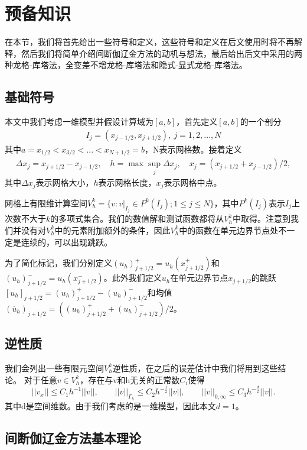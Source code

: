 \cleardoublepage

\section{预备知识}
在本节，我们将首先给出一些符号和定义，这些符号和定义在后文使用时将不再解释，然后我们将简单介绍间断伽辽金方法的动机与想法，最后给出后文中采用的两种龙格-库塔法，全变差不增龙格-库塔法和隐式-显式龙格-库塔法。
\subsection{基础符号}
本文中我们考虑一维模型并假设计算域为$[a,b]$，首先定义$[a,b]$的一个剖分
\begin{align*}
    I_{j} = (x_{j-1/2}, x_{j+1/2}), \ j = 1, 2, ..., N
\end{align*}
其中$a=x_{1/2} < x_{3/2}< ...< x_{N+1/2}=b$，N表示网格数。接着定义
\begin{align*}
    \Delta x_j = x_{j+1/2}-x_{j-1/2}, \quad h = \max{\sup_j{\Delta x_j}}, \quad x_j = (x_{j+1/2}+x_{j-1/2})/{2},
\end{align*}
其中$\Delta x_j$表示网格大小，$h$表示网格长度，$x_j$表示网格中点。

网格上有限维计算空间$V_h^k = \{v:v|_{I_j}\in P^k(I_j); 1\leq j\leq N\}$，其中$P^k(I_j)$表示$I_j$上次数不大于$k$的多项式集合。我们的数值解和测试函数都将从$V_h^k$中取得。注意到我们并没有对$V^k_h$中的元素附加额外的条件，因此$V_h^k$中的函数在单元边界节点处不一定是连续的，可以出现跳跃。

为了简化标记，我们分别定义$(u_h)^+_{j+1/2}=u_h(x^+_{j+1/2})$和$(u_h)^-_{j+1/2}=u_h(x^-_{j+1/2})$。此外我们定义$u_h$在单元边界节点$x_{j+1/2}$的跳跃$[u_h]_{j+1/2}=(u_h)^+_{j+1/2}-(u_h)^-_{j+1/2}$和均值$(\overline{u}_h)_{j+1/2}=((u_h)_{j+1/2}^++(u_h)_{j+1/2}^-)/2$。
\subsection{逆性质}
我们会列出一些有限元空间$V_h^k$逆性质\cite{ciarlet1978finite}，在之后的误差估计中我们将用到这些结论。
对于任意$v \in V_h^k$，存在与v和h无关的正常数$C_i$使得
\begin{equation}
    ||v_x|| \leq C_1 h^{-1} ||v||, \qquad
    ||v||_{\Gamma_h} \leq C_2 h^{-\frac{1}{2}}||v||, \qquad
    ||v||_{0,\infty} \leq C_3 h^{-\frac{d}{2}}||v||.
\end{equation}
其中d是空间维数。由于我们考虑的是一维模型，因此本文$d=1$。
\subsection{间断伽辽金方法基本理论}

